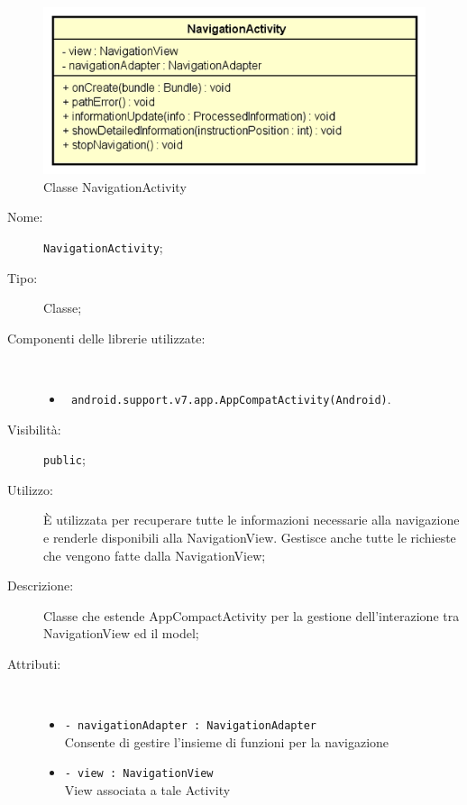 \documentclass[../DefinizioneDiProdotto.tex]{subfiles}
\begin{document}
    \begin{figure}[H]
        \centering
        \includegraphics{img/NavigationActivity.png}
        \caption{Classe NavigationActivity}\label{fig:presenter::NavigationActivity} 
    \end{figure}
    \begin{description}
\item[Nome:] \texttt{NavigationActivity};
\item[Tipo:] Classe;
\item[Componenti delle librerie utilizzate:] \
\begin{itemize}
\item \texttt{ android.support.v7.app.AppCompatActivity(Android)}.

\end{itemize}
\item[Visibilità:] \texttt{public};
\item[Utilizzo:] È utilizzata per recuperare tutte le informazioni necessarie alla navigazione e renderle disponibili alla NavigationView. Gestisce anche tutte le richieste che vengono fatte dalla NavigationView;
\item[Descrizione:] Classe che estende AppCompactActivity per la gestione dell'interazione tra NavigationView ed il model;
\item[Attributi:] \
\begin{itemize}
\item \texttt{- navigationAdapter : NavigationAdapter}\\
Consente di gestire l'insieme di funzioni per la navigazione

\item \texttt{- view : NavigationView}\\
View associata a tale Activity


\end{itemize}
\end{description}
\end{document}
